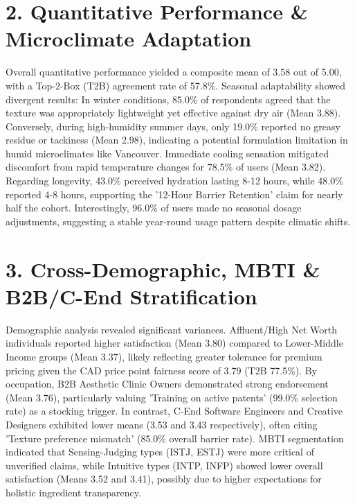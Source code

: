 \documentclass[10pt,twocolumn,a4paper]{article}
\begin{document}
\section{2. Quantitative Performance \& Microclimate Adaptation}
Overall quantitative performance yielded a composite mean of 3.58 out of 5.00, with a Top-2-Box (T2B) agreement rate of 57.8\%. Seasonal adaptability showed divergent results: In winter conditions, 85.0\% of respondents agreed that the texture was appropriately lightweight yet effective against dry air (Mean 3.88). Conversely, during high-humidity summer days, only 19.0\% reported no greasy residue or tackiness (Mean 2.98), indicating a potential formulation limitation in humid microclimates like Vancouver. Immediate cooling sensation mitigated discomfort from rapid temperature changes for 78.5\% of users (Mean 3.82). Regarding longevity, 43.0\% perceived hydration lasting 8-12 hours, while 48.0\% reported 4-8 hours, supporting the '12-Hour Barrier Retention' claim for nearly half the cohort. Interestingly, 96.0\% of users made no seasonal dosage adjustments, suggesting a stable year-round usage pattern despite climatic shifts.
\section{3. Cross-Demographic, MBTI \& B2B/C-End Stratification}
Demographic analysis revealed significant variances. Affluent/High Net Worth individuals reported higher satisfaction (Mean 3.80) compared to Lower-Middle Income groups (Mean 3.37), likely reflecting greater tolerance for premium pricing given the CAD price point fairness score of 3.79 (T2B 77.5\%). By occupation, B2B Aesthetic Clinic Owners demonstrated strong endorsement (Mean 3.76), particularly valuing 'Training on active patents' (99.0\% selection rate) as a stocking trigger. In contrast, C-End Software Engineers and Creative Designers exhibited lower means (3.53 and 3.43 respectively), often citing 'Texture preference mismatch' (85.0\% overall barrier rate). MBTI segmentation indicated that Sensing-Judging types (ISTJ, ESTJ) were more critical of unverified claims, while Intuitive types (INTP, INFP) showed lower overall satisfaction (Means 3.52 and 3.41), possibly due to higher expectations for holistic ingredient transparency.
\end{document}
